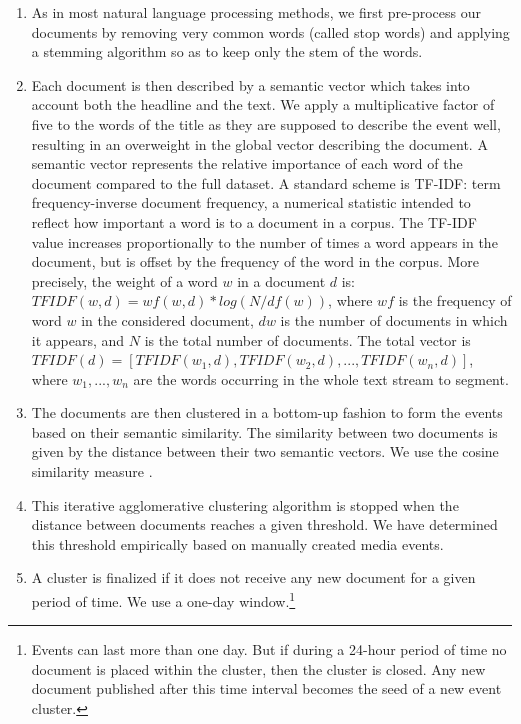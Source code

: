 \begin{enumerate}
\item As in most natural language processing methods, we first pre-process our documents by removing very common words (called stop words) and applying a stemming algorithm so as to keep only the stem of the words.

\item Each document is then described by a semantic vector which takes into account both the headline and the text. We apply a multiplicative factor of five to the words of the title as they are supposed to describe the event well, resulting in an overweight in the global vector describing the document. A semantic vector represents the relative importance of each word of the document compared to the full dataset. A standard scheme is TF-IDF: term frequency-inverse document frequency, a numerical statistic intended to reflect how important a word is to a document in a corpus. The TF-IDF value increases proportionally to the number of times a word appears in the document, but is offset by the frequency of the word in the corpus. More precisely, the weight of a word $w$ in a document $d$ is: $TFIDF(w,d) = wf\left(w,d\right)*log\left(N/df\left(w\right)\right)$, where $wf$ is the frequency of word $w$ in the considered document, $dw$ is the number of documents in which it appears, and $N$ is the total number of documents. The total vector is $TFIDF(d) = \left[TFIDF(w_{1},d),TFIDF(w_{2},d),..., TFIDF(w_{n},d)\right]$, where $w_{1},..., w_{n}$ are the words occurring in the whole text stream to segment.

\item The documents are then clustered in a bottom-up fashion to form the events based on their semantic similarity. The similarity between two documents is given by the distance between their two semantic vectors. We use the cosine similarity measure \citep{Salton1975}.

\item This iterative agglomerative clustering algorithm is stopped when the distance between documents reaches a given threshold. We have determined this threshold empirically based on manually created media events.

\item A cluster is finalized if it does not receive any new document for a given period of time. We use a one-day window.\footnote{Events can last more than one day. But if during a 24-hour period of time no document is placed within the cluster, then the cluster is closed. Any new document published after this time interval becomes the seed of a new event cluster.} 
\end{enumerate}


